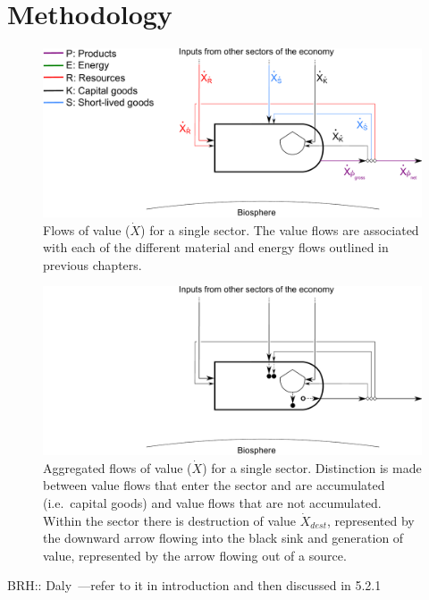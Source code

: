 \section{Methodology}
\label{sec:Value_Methodology}

\begin{figure}[!ht]
\centering
\includegraphics[width=0.8\linewidth]{Part_2/Chapter_Values/images/PERKS_basic_unit_value_all.pdf}
\caption[Flows of value for a single sector]{Flows of value ($\dot{X}$) 
for a single sector. 
The value flows are associated with each of the different 
material and energy flows outlined in previous chapters.}
\label{fig:basic_value} 
\end{figure}

\begin{figure}[!ht]
\centering
\includegraphics[width=0.8\linewidth]{Part_2/Chapter_Values/images/PERKS_basic_unit_value.pdf}
\caption[Aggregated flows of value for a single sector]{Aggregated flows of value ($\dot{X}$) 
for a single sector. 
Distinction is made between value flows that 
enter the sector and are accumulated (i.e.\ capital goods) 
and value flows that are not accumulated. 
Within the sector there is destruction of value $\dot{X}_{dest}$, 
represented by the downward arrow flowing 
into the black sink and generation of value, 
represented by the arrow flowing out of a source. }
\label{fig:basic_value_aggregated} 
\end{figure}


BRH:: Daly~\cite{daly1995}---refer to it in introduction and then discussed in 5.2.1


